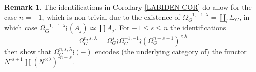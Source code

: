 \documentclass[a4paper,10pt
,draft
]{article}%
\numberwithin{equation}{section}
\numberwithin{figure}{section}
\theoremstyle{definition} %
\newtheorem{remark}[equation]{Remark}%
\newcommand{\Fin}{\mathsf{F}}%
\newcommand{\V}{\ensuremath{\mathcal V}}
\newcommand{\1}{\ensuremath{\mathbbm 1}}%
\begin{document}
\begin{remark}\label{NPXY_REM}
The identifications in Corollary \ref{LABIDEN COR} do allow for the case $n=-1$,
which is non-trivial due to the existence of
 $\Omega_G^{-1,-1,\lambda} = \coprod_l \Sigma_G$,
 in which case $\Omega_G^{-1,-1,\lambda} \wr (A_j) \simeq \coprod A_j$.
For $-1\leq s \leq n$ the identifications
\[
	\Omega_G^{n,s,\lambda} =
	\Omega_G^{s} \wr \Omega_G^{-1,-1} \wr (\Omega_G^{n-s-1})^{\times \lambda}
\]
then show that 
$\Omega_G^{n,s,\lambda} \wr (\minus)$
encodes (the underlying category of) the functor
$N^{\circ s+1} \coprod (N^{\times \lambda})^{\circ n-s}$.


\end{remark}
\end{document}
